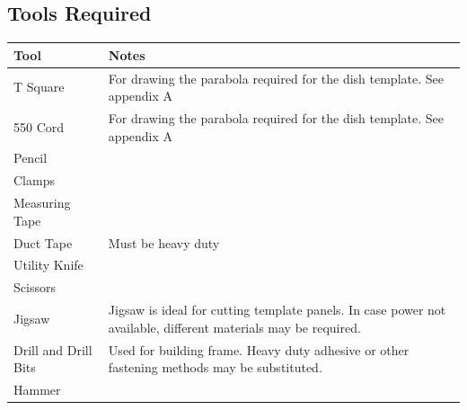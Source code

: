 \documentclass{article}
\begin{document}
        \subsection{Tools Required}
            \begin{table}[h!]
                \begin{tabular}{|p{3cm}|p{14cm}|}
                \hline
                \rowcolor[HTML]{C0C0C0} 
                Tool                 & Notes                                                                                                           \\ \hline
                T Square             & For drawing the parabola required for the dish template.  See appendix A                                        \\ \hline
                550 Cord             & For drawing the parabola required for the dish template.  See appendix A                                        \\ \hline
                Pencil               &                                                                                                                 \\ \hline
                Clamps               &                                                                                                                 \\ \hline
                Measuring Tape       &                                                                                                                 \\ \hline
                Duct Tape            & Must be heavy duty                                                                                              \\ \hline
                Utility Knife        &                                                                                                                 \\ \hline
                Scissors             &                                                                                                                 \\ \hline
                Jigsaw               & Jigsaw is ideal for cutting template panels.  In case power not available, different materials may be required. \\ \hline
                Drill and Drill Bits & Used for building frame.  Heavy duty adhesive or other fastening methods may be substituted.                    \\ \hline
                Hammer               &                                                                                                                 \\ \hline
                \end{tabular}
                \end{table}
        
\end{document}
